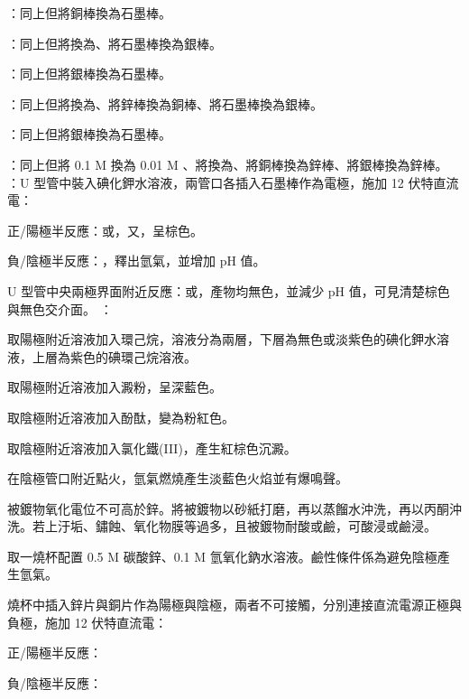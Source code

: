 \documentclass[a4paper,12pt]{article}
\begin{document}
\item {}：同上但將銅棒換為石墨棒。
\item {}：同上但將換為、將石墨棒換為銀棒。
\item {}：同上但將銀棒換為石墨棒。
\item {}：同上但將換為、將鋅棒換為銅棒、將石墨棒換為銀棒。
\item {}：同上但將銀棒換為石墨棒。
\item {}：同上但將 0.1 M  換為 0.01 M 、將換為、將銅棒換為鋅棒、將銀棒換為鋅棒。
\een
{}
：U 型管中裝入碘化鉀水溶液，兩管口各插入石墨棒作為電極，施加 12 伏特直流電：
\bit
\item 正/陽極半反應：或，又，呈棕色。
\item 負/陰極半反應：，釋出氫氣，並增加 pH 值。
\item U 型管中央兩極界面附近反應：或，產物均無色，並減少 pH 值，可見清楚棕色與無色交介面。
\eit
{}：
\bit
\item 取陽極附近溶液加入環己烷，溶液分為兩層，下層為無色或淡紫色的碘化鉀水溶液，上層為紫色的碘環己烷溶液。
\item 取陽極附近溶液加入澱粉，呈深藍色。
\item 取陰極附近溶液加入酚酞，變為粉紅色。
\item 取陰極附近溶液加入氯化鐵(III)，產生紅棕色沉澱。
\item 在陰極管口附近點火，氫氣燃燒產生淡藍色火焰並有爆鳴聲。
\eit
{}
\ben
\item 被鍍物氧化電位不可高於鋅。將被鍍物以砂紙打磨，再以蒸餾水沖洗，再以丙酮沖洗。若上汙垢、鏽蝕、氧化物膜等過多，且被鍍物耐酸或鹼，可酸浸或鹼浸。
\item 取一燒杯配置 0.5 M 碳酸鋅、0.1 M 氫氧化鈉水溶液。鹼性條件係為避免陰極產生氫氣。
\item 燒杯中插入鋅片與銅片作為陽極與陰極，兩者不可接觸，分別連接直流電源正極與負極，施加 12 伏特直流電：
\bit
\item 正/陽極半反應：
\item 負/陰極半反應：
\end{document}
